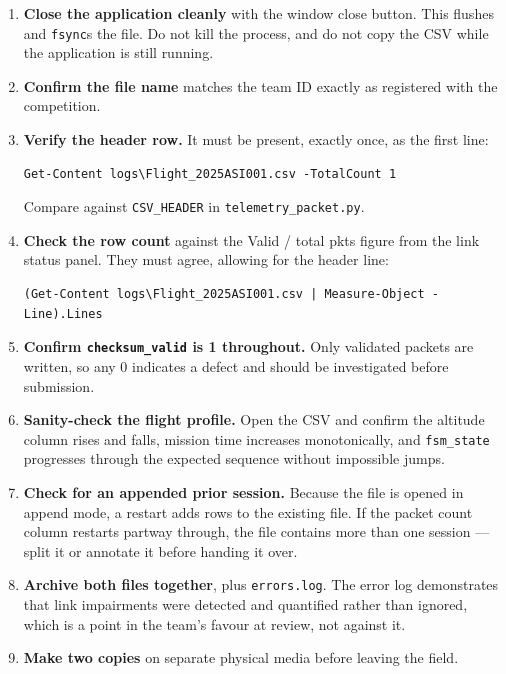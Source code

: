 \documentclass[11pt,a4paper]{article}
\newcommand{\file}[1]{\texttt{#1}}
\newcommand{\code}[1]{\texttt{#1}}
\begin{document}
\begin{enumerate}
  \item \textbf{Close the application cleanly} with the window close button.
        This flushes and \code{fsync}s the file. Do not kill the process, and
        do not copy the CSV while the application is still running.
  \item \textbf{Confirm the file name} matches the team ID exactly as
        registered with the competition.
  \item \textbf{Verify the header row.} It must be present, exactly once, as
        the first line:
\begin{lstlisting}[style=gcsshell]
Get-Content logs\Flight_2025ASI001.csv -TotalCount 1
\end{lstlisting}
        Compare against \code{CSV\_HEADER} in \file{telemetry\_packet.py}.
  \item \textbf{Check the row count} against the \textsf{Valid / total pkts}
        figure from the link status panel. They must agree, allowing for the
        header line:
\begin{lstlisting}[style=gcsshell]
(Get-Content logs\Flight_2025ASI001.csv | Measure-Object -Line).Lines
\end{lstlisting}
  \item \textbf{Confirm \code{checksum\_valid} is 1 throughout.} Only
        validated packets are written, so any 0 indicates a defect and should
        be investigated before submission.
  \item \textbf{Sanity-check the flight profile.} Open the CSV and confirm
        the altitude column rises and falls, mission time increases
        monotonically, and \code{fsm\_state} progresses through the expected
        sequence without impossible jumps.
  \item \textbf{Check for an appended prior session.} Because the file is
        opened in append mode, a restart adds rows to the existing file. If
        the packet count column restarts partway through, the file contains
        more than one session --- split it or annotate it before handing it
        over.
  \item \textbf{Archive both files together}, plus \file{errors.log}. The
        error log demonstrates that link impairments were detected and
        quantified rather than ignored, which is a point in the team's favour
        at review, not against it.
  \item \textbf{Make two copies} on separate physical media before leaving
        the field.
\end{enumerate}
\end{document}

